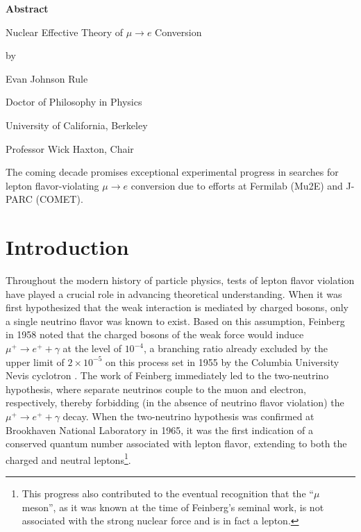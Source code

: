 \documentclass{book}[12pt]
\begin{document}
\newpage
{}
\thispagestyle{plain}
\begin{center}
\textbf{Abstract}

\vspace{2cm}
Nuclear Effective Theory of $\mu\rightarrow e$ Conversion

\vspace{0.5cm}
by

\vspace{0.5cm}
Evan Johnson Rule

\vspace{0.5cm}
Doctor of Philosophy in Physics

\vspace{0.5cm}
University of California, Berkeley

\vspace{0.5cm}
Professor Wick Haxton, Chair
\end{center}
The coming decade promises exceptional experimental progress in searches for lepton flavor-violating $\mu\rightarrow e$ conversion due to efforts at Fermilab (Mu2E) and J-PARC (COMET). 
\frontmatter
\tableofcontents
\listoffigures
\listoftables
\mainmatter
\chapter{Introduction}
Throughout the modern history of particle physics, tests of lepton flavor violation have played a crucial role in advancing theoretical understanding. When it was first hypothesized that the weak interaction is mediated by charged bosons, only a single neutrino flavor was known to exist. Based on this assumption, Feinberg \cite{PhysRev.110.1482} in 1958 noted that the charged bosons of the weak force would induce $\mu^+\rightarrow e^+ + \gamma$ at the level of $10^{-4}$, a branching ratio already excluded by the upper limit of $2\times 10^{-5}$ on this process set in 1955 by the Columbia University Nevis cyclotron \cite{PhysRev.98.240}. The work of Feinberg immediately led to the two-neutrino hypothesis, where separate neutrinos couple to the muon and electron, respectively, thereby forbidding (in the absence of neutrino flavor violation) the $\mu^+\rightarrow e^+ + \gamma$ decay. When the two-neutrino hypothesis was confirmed at Brookhaven National Laboratory \cite{PhysRevLett.9.36} in 1965, it was the first indication of a conserved quantum number associated with lepton flavor, extending to both the charged and neutral leptons\footnote{This progress also contributed to the eventual recognition that the ``$\mu$ meson'', as it was known at the time of Feinberg's seminal work, is not associated with the strong nuclear force and is in fact a lepton.}. 
\end{document}
